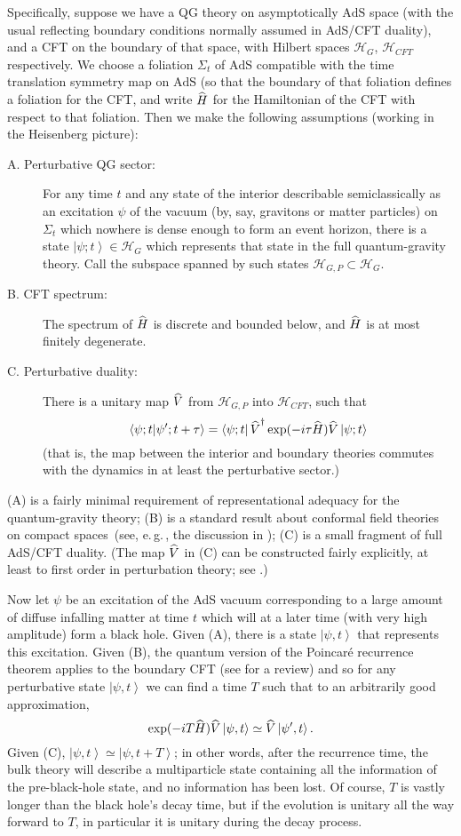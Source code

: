 \documentclass[12pt]{article}
\newcommand{\AdS}{\mbox{AdS}}
\newcommand{\egc}{\mbox{e.\,g.\,}}
\newcommand{\mc}[1]{\ensuremath{\mathcal{#1}}}
\newcommand{\ket}[1]{\ensuremath{\left|  #1 \right\rangle}}
\newcommand{\bra}[1]{\ensuremath{\left\langle #1 \right|}}
\newcommand{\bk}[2]{\ensuremath{\left\langle #1 | #2 \right\rangle}}
\newcommand{\matel}[3]{\ensuremath{\bra{#1} #2 \ket{#3}}}
\newcommand{\op}[1]{\ensuremath{\widehat{\textsf{\ensuremath{#1}}}}}
\newcommand{\opad}[1]{\ensuremath{\op{#1}^{\dagger}}}
\newcommand{\be}{\begin{equation}}
\newcommand{\ee}{\end{equation}}
\begin{document}
Specifically, suppose we have a QG theory on asymptotically $\AdS$ space (with the usual reflecting boundary conditions normally assumed in AdS/CFT duality), and a CFT on the boundary of that space, with Hilbert spaces $\mc{H}_G$, $\mc{H}_{CFT}$ respectively. We choose a foliation $\Sigma_t$ of $\AdS$ compatible with the time translation symmetry map on $\AdS$ (so that the boundary of that foliation defines a foliation for the CFT, and write $\op{H}$ for the Hamiltonian of the CFT with respect to that foliation. Then we make the following assumptions (working in the Heisenberg picture):
\begin{description}
\item[A. Perturbative QG sector:] For any time $t$ and any state of the interior describable semiclassically as an excitation $\psi$ of the vacuum (by, say, gravitons or matter particles) on $\Sigma_t$ which nowhere is dense enough to form an event horizon, there is a state $\ket{\psi;t}\in\mc{H}_G$ which represents that state in the full quantum-gravity theory. Call the subspace spanned by such states $\mc{H}_{G,P}\subset \mc{H}_G$.
\item[B. CFT spectrum:] The spectrum of \op{H} is discrete and bounded below, and $\op{H}$ is at most finitely degenerate.
\item[C. Perturbative duality:] There is a unitary map $\op{V}$ from $\mc{H}_{G,P}$ into $\mc{H}_{CFT}$, such that 
\be 
\bk{\psi;t}{\psi';t+\tau}=\matel{\psi;t}{\opad{V}\exp(-i \tau \op{H})\op{V}}{\psi;t}
\ee
(that is, the map between the interior and boundary theories commutes with the dynamics in at least the perturbative sector.)
\end{description}
(A) is a fairly minimal requirement of representational adequacy for the quantum-gravity theory; (B) is a standard result about conformal field theories on compact spaces~(see, \egc, the discussion in ); (C) is a small fragment of full AdS/CFT duality. (The map $\op{V}$ in (C) can be constructed fairly explicitly, at least to first order in perturbation theory; see .)

Now let $\psi$ be an excitation of the AdS vacuum corresponding to a large amount of diffuse infalling matter at time $t$ which will at a later time (with very high amplitude) form a black hole. Given (A), there is a state $\ket{\psi,t}$ that represents this excitation.
Given (B), the quantum version of the Poincar\'{e} recurrence theorem applies to the boundary CFT (see  for a review) and so for any perturbative state $\ket{\psi,t}$ we can find a time $T$ such that to an arbitrarily good approximation,
\be
\exp(-i T\op{H})\op{V}\ket{\psi,t}\simeq\op{V}\ket{\psi',t}.
\ee
Given (C), $\ket{\psi,t}\simeq \ket{\psi,t+T}$; in other words, after the recurrence time, the bulk theory will describe a multiparticle state containing all the information of the pre-black-hole state, and no information has been lost. Of course, $T$ is vastly longer than the black hole's decay time, but if the evolution is unitary all the way forward to $T$, in particular it is unitary during the decay process.
\end{document}
